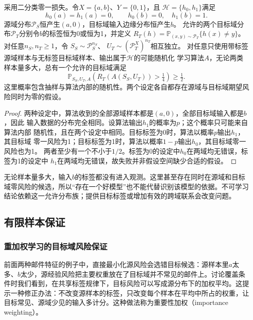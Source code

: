 \begin{theorem}[缺少覆盖时的不可学习性]
\label{thm:transfer-nonidentifiability}
采用二分类零一损失。令$X=\{a,b\}$、$Y=\{0,1\}$，且
$\mathcal H=\{h_0,h_1\}$满足
\[
 h_0(a)=h_1(a)=0,\qquad h_0(b)=0,\quad h_1(b)=1.
\]
源域分布$\mathcal P_S$恒产生$(a,0)$，目标域输入边缘分布恒产生$b$。
允许的两个目标域分布$\mathcal P_T$分别令$b$的标签恒为0或恒为1，并定义
$R_T(h)=\mathbb P_{(x,y)\sim\mathcal P_T}\{h(x)\neq y\}$。
对任意$n_S,n_T\geq1$，令
$S_S\sim\mathcal P_S^{n_S}$、
$U_T\sim(\mathcal P_T^X)^{n_T}$相互独立。
对任意只使用带标签源域样本与无标签目标域样本、输出属于$\mathcal H$的可能随机化
学习算法$A$，无论两类样本量多大，总有一个允许的目标域满足
\[
 \mathbb P_{S_S,U_T,A}\!\left(
 R_T(A(S_S,U_T))>\tfrac14
 \right)\geq\tfrac12.
\]
这里概率包含抽样与算法内部的随机性。两个设定各自都存在源域与目标域期望风险同时为零的假设。
\end{theorem}
\begin{proof}
两种设定中，算法收到的全部源域样本都是$(a,0)$，全部目标域输入都是$b$，因此
输入数据的分布完全相同。设算法输出$h_1$的概率为$p$；这个概率只可能来自算法内部
随机性，且在两个设定中相同。目标标签为0时，算法以概率$p$输出$h_1$，其目标域
零一风险为1；目标标签为1时，算法以概率$1-p$输出$h_0$，其目标域零一风险也为1。
两者至少有一个不小于$1/2$。标签为0的设定中$h_0$在两域均无错误，标签为1的设定中
$h_1$在两域均无错误，故失败并非假设空间缺少合适的假设。
\end{proof}

无论样本量多大，输入$b$的标签都没有进入观测。这里甚至存在同时在源域和目标域零风险的候选，所以“存在一个好模型”也不能代替识别该模型的依据。不可学习结论依赖这一允许分布族；提供目标标签或增加有效的跨域联系会改变问题。

\subsection{有限样本保证}

\subsubsection{重加权学习的目标域风险保证}
\label{sec:adaptation-coverage}

前面两种邮件特征的例子中，直接最小化源风险会选错目标候选：源样本里$a$太多、$b$太少，源经验风险把主要权重放在了目标域并不常见的邮件上。讨论覆盖条件时我们看到，在共享标签规律下，目标风险可以写成源分布下的加权平均。这提示一种修正办法：不改变源样本的标签，只改变每个样本在平均中所占的权重，让目标常见、源域少见的输入多计分。这种做法称为重要性加权（importance weighting）。

